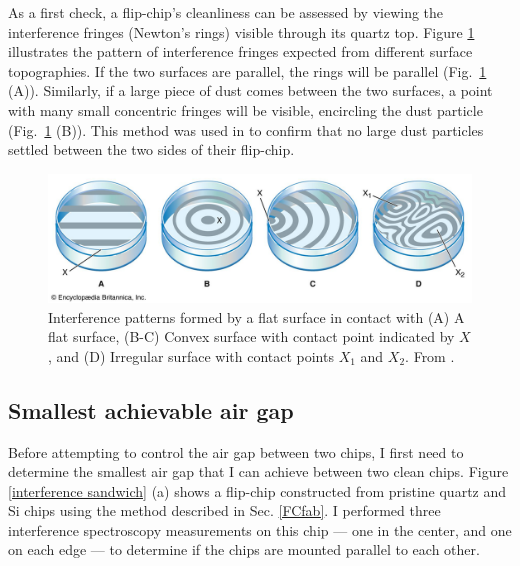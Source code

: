 \documentclass[double,12pt,1in,seploa]{beavtex}
\let\Oldsubsection\subsection
\renewcommand{\subsection}{\FloatBarrier\Oldsubsection}
\begin{document}
As a first check, a flip-chip's cleanliness can be assessed by viewing the interference fringes (Newton's rings) visible through its quartz top. Figure \ref{newtonsrings} illustrates the pattern of interference fringes expected from different surface topographies. If the two surfaces are parallel, the rings will be parallel (Fig.\ \ref{newtonsrings} (A)). Similarly, if a large piece of dust comes between the two surfaces, a point with many small concentric fringes will be visible, encircling the dust particle (Fig.\ \ref{newtonsrings} (B)). This method was used in \cite{bennaceur_mechanical_2015} to confirm that no large dust particles settled between the two sides of their flip-chip.

\begin{figure}
    \includegraphics[width=1\textwidth]{newtonsrings.png}
    \caption{Interference patterns formed by a flat surface in contact with (A) A flat surface, (B-C) Convex surface with contact point indicated by $X$, and (D) Irregular surface with contact points $X_1$ and $X_2$.  From \cite{noauthor_newtons_nodate}.}
    \label{newtonsrings}
\end{figure}



\subsection{Smallest achievable air gap} \label{smallest achievable air gap}
Before attempting to control the air gap between two chips, I first need to determine the smallest air gap that I can achieve between two clean chips. Figure \ref{interference sandwich} (a) shows a flip-chip constructed from pristine quartz and Si chips using the method described in Sec. \ref{FCfab}. I performed three interference spectroscopy measurements on this chip — one in the center, and one on each edge — to determine if the chips are mounted parallel to each other.
\end{document}
